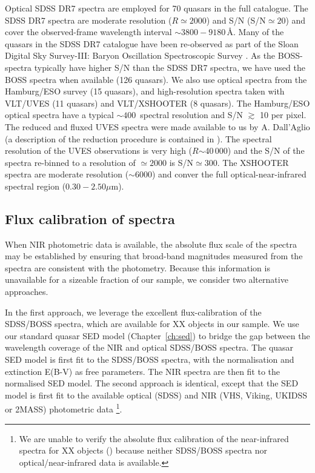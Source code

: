 Optical SDSS DR7 spectra are employed for 70 quasars in the full catalogue.  
The SDSS DR7 spectra are moderate resolution ($R$$\simeq2000$) and S/N (S/N$\simeq20$) and cover the observed-frame wavelength interval $\sim3800-9180$\,\AA.
Many of the quasars in the SDSS DR7 catalogue have been re-observed as part of the Sloan Digital Sky Survey-III: Baryon Oscillation Spectroscopic Survey \citep[SDSS-III/BOSS;][]{dawson13}. 
As the BOSS-spectra typically have higher S/N than the SDSS DR7 spectra, we have used the BOSS spectra when available (126 quasars).  
We also use optical spectra from the Hamburg/ESO survey (15 quasars), and high-resolution spectra taken with VLT/UVES (11 quasars) and VLT/XSHOOTER (8 quasars). 
The Hamburg/ESO optical spectra have a typical $\sim400$\kms\, spectral resolution and S/N $\gtrsim$ 10 per pixel. 
The reduced and fluxed UVES spectra were made available to us by A. Dall'Aglio (a description of the reduction procedure is contained in \citet{dallaglio08}).
The spectral resolution of the UVES observations is very high ($R$$\sim$40\,000) and the S/N of the spectra re-binned to a resolution of $\simeq2000$ is S/N$\simeq300$.  
The XSHOOTER spectra are moderate resolution ($\sim6000$) and conver the full optical-near-infrared spectral region ($0.30-2.50\mu$m). 

\subsection{Flux calibration of spectra}

When NIR photometric data is available, the absolute flux scale of the spectra may be established by ensuring that broad-band magnitudes measured from the spectra are consistent with the photometry. 
Because this information is unavailable for a sizeable fraction of our sample, we consider two alternative approaches. 

In the first approach, we leverage the excellent flux-calibration of the SDSS/BOSS spectra, which are available for XX objects in our sample. 
We use our standard quasar SED model (Chapter~\ref{ch:sed}) to bridge the gap between the wavelength coverage of the NIR and optical SDSS/BOSS spectra.
The quasar SED model is first fit to the SDSS/BOSS spectra, with the normalisation and extinction E(B-V) as free parameters. 
The NIR spectra are then fit to the normalised SED model. 
The second approach is identical, except that the SED model is first fit to the available optical (SDSS) and NIR (VHS, Viking, UKIDSS or 2MASS) photometric data \footnote{We are unable to verify the absolute flux calibration of the near-infrared spectra for XX objects () because neither SDSS/BOSS spectra nor optical/near-infrared data is available.}. 

